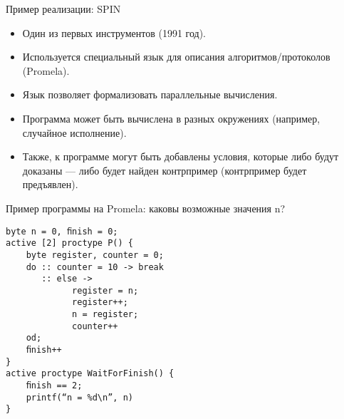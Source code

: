 \documentclass[aspectratio=169,dvipsnames,usenames]{beamer}
\begin{document}
\begin{frame}{Пример реализации: SPIN}
\begin{itemize}
\item Один из первых инструментов (1991 год).
\item Используется специальный язык для описания алгоритмов/протоколов (Promela).
\item Язык позволяет формализовать параллельные вычисления.
\item Программа может быть вычислена в разных окружениях (например, случайное исполнение).
\item Также, к программе могут быть добавлены условия, которые либо будут доказаны --- либо
будет найден контрпример (контрпример будет предъявлен).
\end{itemize}
\end{frame}

\begin{frame}[fragile]{Пример программы на Promela: каковы возможные значения n?}
\begin{verbatim}
byte n = 0, ﬁnish = 0;
active [2] proctype P() {
    byte register, counter = 0;
    do :: counter = 10 -> break
       :: else ->
             register = n;
             register++;
             n = register;
             counter++
    od;
    ﬁnish++
}
active proctype WaitForFinish() {
    ﬁnish == 2;
    printf(“n = %d\n”, n)
}
\end{verbatim}
\end{frame}

\end{document}
